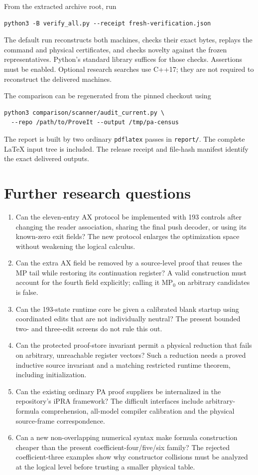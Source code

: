 \documentclass[11pt,letterpaper]{article}
\newcommand{\file}[1]{\nolinkurl{#1}}
\begin{document}
From the extracted archive root, run
\begin{verbatim}
python3 -B verify_all.py --receipt fresh-verification.json
\end{verbatim}
The default run reconstructs both machines, checks their exact bytes,
replays the command and physical certificates, and checks novelty against
the frozen representatives. Python's standard library suffices for those
checks. Assertions must be enabled. Optional research searches use C++17;
they are not required to reconstruct the delivered machines.

The comparison can be regenerated from the pinned checkout using
\begin{verbatim}
python3 comparison/scanner/audit_current.py \
  --repo /path/to/ProveIt --output /tmp/pa-census
\end{verbatim}
The report is built by two ordinary \texttt{pdflatex} passes in
\file{report/}. The complete LaTeX input tree is included. The release
receipt and file-hash manifest identify the exact delivered outputs.



\section{Further research questions}

\begin{enumerate}
\item Can the eleven-entry AX protocol be implemented with 193 controls
after changing the reader association, sharing the final push decoder,
or using its known-zero exit fields? The new protocol enlarges the
optimization space without weakening the logical calculus.
\item Can the extra AX field be removed by a source-level proof that
reuses the MP tail while restoring its continuation register? A valid
construction must account for the fourth field explicitly; calling it
MP$_0$ on arbitrary candidates is false.
\item Can the 193-state runtime core be given a calibrated blank startup
using coordinated edits that are not individually neutral? The present
bounded two- and three-edit screens do not rule this out.
\item Can the protected proof-store invariant permit a physical reduction
that fails on arbitrary, unreachable register vectors? Such a reduction
needs a proved inductive source invariant and a matching restricted
runtime theorem, including initialization.
\item Can the existing ordinary PA proof suppliers be internalized in
the repository's iPRA framework? The difficult interfaces include
arbitrary-formula comprehension, all-model compiler calibration and
the physical source-frame correspondence.
\item Can a new non-overlapping numerical syntax make formula construction
cheaper than the present coefficient-four/five/six family? The rejected
coefficient-three examples show why constructor collisions must be
analyzed at the logical level before trusting a smaller physical table.
\end{enumerate}
\end{document}

